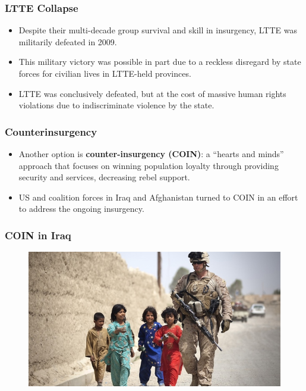 \documentclass[handout]{beamer}
\begin{document}
\begin{frame} 
	\frametitle{\LARGE{LTTE Collapse}}
	\begin{itemize}
		\item Despite their multi-decade group survival and skill in insurgency, LTTE was militarily defeated in 2009. \pause
		\item This military victory was possible in part due to a reckless disregard by state forces for civilian lives in LTTE-held provinces. \pause
		\item LTTE was conclusively defeated, but at the cost of massive human rights violations due to indiscriminate violence by the state.
	\end{itemize}
\end{frame}

\begin{frame} 
	\frametitle{\LARGE{Counterinsurgency}}
	\begin{itemize}
		\item Another option is \textbf{counter-insurgency (COIN)}: a ``hearts and minds'' approach that focuses on winning population loyalty through providing security and services, decreasing rebel support. \pause
		\item US and coalition forces in Iraq and Afghanistan turned to COIN in an effort to address the ongoing insurgency. \pause
	\end{itemize}
\end{frame}

\begin{frame} 
	\frametitle{\LARGE{COIN in Iraq}}
	\begin{figure}[ht!]
		\centering
		\includegraphics[width=\textwidth,height=\textheight,keepaspectratio]{COIN.jpg}
	\end{figure}
\end{frame}
\end{document}
